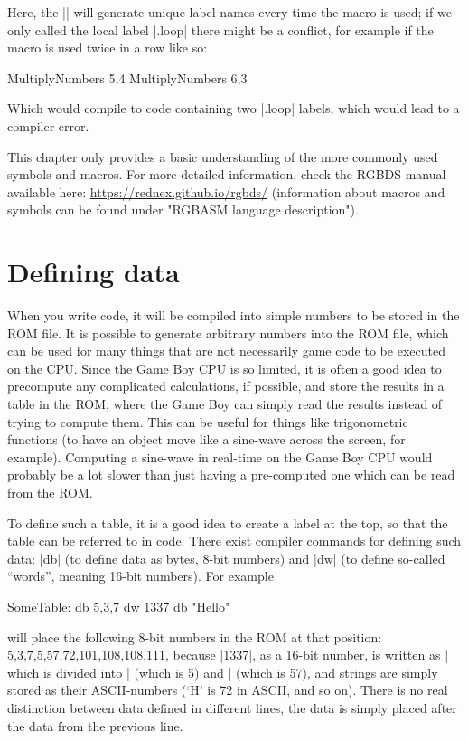 \documentclass[11pt]{book}
\begin{document}
Here, the |\@| will generate unique label names every time the macro is used; if we only called the local label |.loop| there might be a conflict, for example if the macro is used twice in a row like so:

\begin{code}
MultiplyNumbers 5,4
MultiplyNumbers 6,3
\end{code}

Which would compile to code containing two |.loop| labels, which would lead to a compiler error.    

This chapter only provides a basic understanding of the more commonly used symbols and macros. For more detailed information, check the RGBDS manual available here: \url{https://rednex.github.io/rgbds/} (information about macros and symbols can be found under "RGBASM language description").

\section{Defining data}
\label{defdata}
When you write code, it will be compiled into simple numbers to be stored in the ROM file. It is possible to generate arbitrary numbers into the ROM file, which can be used for many things that are not necessarily game code to be executed on the CPU. Since the Game Boy CPU is so limited, it is often a good idea to precompute any complicated calculations, if possible, and store the results in a table in the ROM, where the Game Boy can simply read the results instead of trying to compute them. This can be useful for things like trigonometric functions (to have an object move like a sine-wave across the screen, for example). Computing a sine-wave in real-time on the Game Boy CPU would probably be a lot slower than just having a pre-computed one which can be read from the ROM.

To define such a table, it is a good idea to create a label at the top, so that the table can be referred to in code. There exist compiler commands for defining such data: |db| (to define data as bytes, 8-bit numbers) and |dw| (to define so-called “words”, meaning 16-bit numbers). For example

\begin{code}
SomeTable:
   db 5,3,7
   dw 1337
   db "Hello"
\end{code}

will place the following 8-bit numbers in the ROM at that position: 5,3,7,5,57,72,101,108,108,111, because |1337|, as a 16-bit number, is written as |%
which is divided into |%
(which is 5) and |%
(which is 57), and strings are simply stored as their ASCII-numbers (‘H’ is 72 in ASCII, and so on). There is no real distinction between data defined in different lines, the data is simply placed after the data from the previous line.
\end{document}
